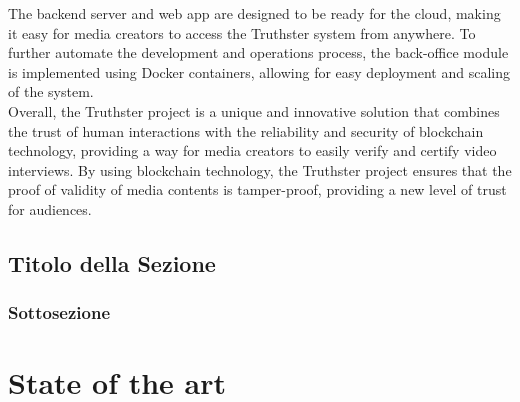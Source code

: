 \documentclass[target=mst,aauheader=]{thud}
\begin{document}
The backend server and web app are designed to be ready for the cloud, making it easy for media creators to access the Truthster system from anywhere. To further automate the development and operations process, the back-office module is implemented using Docker containers, allowing for easy deployment and scaling of the system.\\

Overall, the Truthster project is a unique and innovative solution that combines the trust of human interactions with the reliability and security of blockchain technology, providing a way for media creators to easily verify and certify video interviews. By using blockchain technology, the Truthster project ensures that the proof of validity of media contents is tamper-proof, providing a new level of trust for audiences.

\section{Titolo della Sezione}

\subsection{Sottosezione}





\chapter{State of the art}
\end{document}
